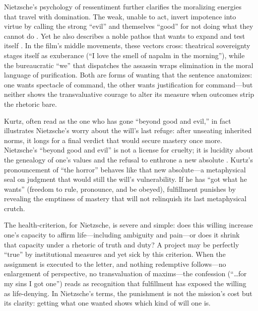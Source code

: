 Nietzsche's psychology of ressentiment further clarifies the moralizing energies that travel
with domination. The weak, unable to act, invert impotence into virtue by calling the strong
``evil'' and themselves ``good'' for not doing what they cannot do
\parencite[I.10--14]{NietzscheGenealogy1994}. Yet he also describes a noble pathos that wants
to expand and test itself \parencite[\S\S 260--265]{NietzscheBGE1990}. In the film's middle
movements, these vectors cross: theatrical sovereignty stages itself as exuberance
(``I love the smell of napalm in the morning''), while the bureaucratic ``we'' that dispatches
the assassin wraps elimination in the moral language of purification. Both are forms of wanting
that the sentence anatomizes: one wants spectacle of command, the other wants justification for
command—but neither shows the transvaluative courage to alter its measure when outcomes strip
the rhetoric bare.

Kurtz, often read as the one who has gone ``beyond good and evil,'' in fact illustrates
Nietzsche's worry about the will's last refuge: after unseating inherited norms, it longs for
a final verdict that would secure mastery once more. Nietzsche's ``beyond good and evil'' is
not a license for cruelty; it is lucidity about the genealogy of one's values and the refusal
to enthrone a new absolute \parencite[\S\S 259--260]{NietzscheBGE1990}. Kurtz's pronouncement
of ``the horror'' behaves like that new absolute—a metaphysical seal on judgment that would
still the will's vulnerability. If he has ``got what he wants'' (freedom to rule, pronounce,
and be obeyed), fulfillment punishes by revealing the emptiness of mastery that will not
relinquish its last metaphysical crutch.

The health-criterion, for Nietzsche, is severe and simple: does this willing increase one's
capacity to affirm life—including ambiguity and pain—or does it shrink that capacity under a
rhetoric of truth and duty? A project may be perfectly ``true'' by institutional measures and
yet sick by this criterion. When the assignment is executed to the letter, and nothing
redemptive follows—no enlargement of perspective, no transvaluation of maxims—the confession
(``\ldots for my sins I got one'') reads as recognition that fulfillment has exposed the willing
as life-denying. In Nietzsche's terms, the punishment is not the mission's cost but its clarity:
getting what one wanted shows which kind of will one is.
